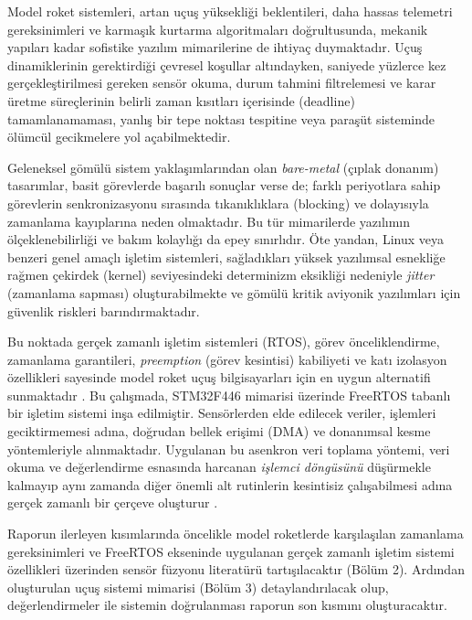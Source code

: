 Model roket sistemleri, artan uçuş yüksekliği beklentileri, daha hassas telemetri gereksinimleri ve karmaşık kurtarma algoritmaları doğrultusunda, mekanik yapıları kadar sofistike yazılım mimarilerine de ihtiyaç duymaktadır. Uçuş dinamiklerinin gerektirdiği çevresel koşullar altındayken, saniyede yüzlerce kez gerçekleştirilmesi gereken sensör okuma, durum tahmini filtrelemesi ve karar üretme süreçlerinin belirli zaman kısıtları içerisinde (deadline) tamamlanamaması, yanlış bir tepe noktası tespitine veya paraşüt sisteminde ölümcül gecikmelere yol açabilmektedir.

Geleneksel gömülü sistem yaklaşımlarından olan \textit{bare-metal} (çıplak donanım) tasarımlar, basit görevlerde başarılı sonuçlar verse de; farklı periyotlara sahip görevlerin senkronizasyonu sırasında tıkanıklıklara (blocking) ve dolayısıyla zamanlama kayıplarına neden olmaktadır. Bu tür mimarilerde yazılımın ölçeklenebilirliği ve bakım kolaylığı da epey sınırlıdır. Öte yandan, Linux veya benzeri genel amaçlı işletim sistemleri, sağladıkları yüksek yazılımsal esnekliğe rağmen çekirdek (kernel) seviyesindeki determinizm eksikliği nedeniyle \textit{jitter} (zamanlama sapması) oluşturabilmekte ve gömülü kritik aviyonik yazılımları için güvenlik riskleri barındırmaktadır. 

Bu noktada gerçek zamanlı işletim sistemleri (RTOS), görev önceliklendirme, zamanlama garantileri, \textit{preemption} (görev kesintisi) kabiliyeti ve katı izolasyon özellikleri sayesinde model roket uçuş bilgisayarları için en uygun alternatifi sunmaktadır \cite{liu1973scheduling}. Bu çalışmada, STM32F446 mimarisi üzerinde FreeRTOS tabanlı bir işletim sistemi inşa edilmiştir. Sensörlerden elde edilecek veriler, işlemleri geciktirmemesi adına, doğrudan bellek erişimi (DMA) ve donanımsal kesme yöntemleriyle alınmaktadır. Uygulanan bu asenkron veri toplama yöntemi, veri okuma ve değerlendirme esnasında harcanan \textit{işlemci döngüsünü} düşürmekle kalmayıp aynı zamanda diğer önemli alt rutinlerin kesintisiz çalışabilmesi adına gerçek zamanlı bir çerçeve oluşturur \cite{freertos_tasks}.

Raporun ilerleyen kısımlarında öncelikle model roketlerde karşılaşılan zamanlama gereksinimleri ve FreeRTOS ekseninde uygulanan gerçek zamanlı işletim sistemi özellikleri üzerinden sensör füzyonu literatürü tartışılacaktır (Bölüm 2). Ardından oluşturulan uçuş sistemi mimarisi (Bölüm 3) detaylandırılacak olup, değerlendirmeler ile sistemin doğrulanması raporun son kısmını oluşturacaktır.
\clearpage
